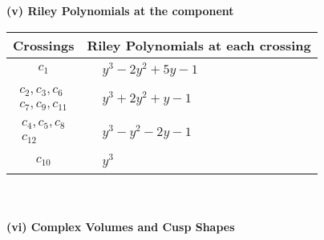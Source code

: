 \documentclass[1p]{elsarticle_modified}
\theoremstyle{definition}
\begin{document}
\flushleft \textbf{(v) Riley Polynomials at the component}\newline \\
\begin{tabular}{m{50pt}|m{274pt}}
Crossings & \hspace{64pt}Riley Polynomials at each crossing \\
\hline $$\begin{aligned}c_{1}\end{aligned}$$&$\begin{aligned}
&y^3-2 y^2+5 y-1
\end{aligned}$\\
\hline $$\begin{aligned}c_{2},c_{3},c_{6}\\c_{7},c_{9},c_{11}\end{aligned}$$&$\begin{aligned}
&y^3+2 y^2+y-1
\end{aligned}$\\
\hline $$\begin{aligned}c_{4},c_{5},c_{8}\\c_{12}\end{aligned}$$&$\begin{aligned}
&y^3- y^2-2 y-1
\end{aligned}$\\
\hline $$\begin{aligned}c_{10}\end{aligned}$$&$\begin{aligned}
&y^3
\end{aligned}$\\
\hline
\end{tabular}\\~\\
\newpage\flushleft \textbf{(vi) Complex Volumes and Cusp Shapes}
\end{document}
